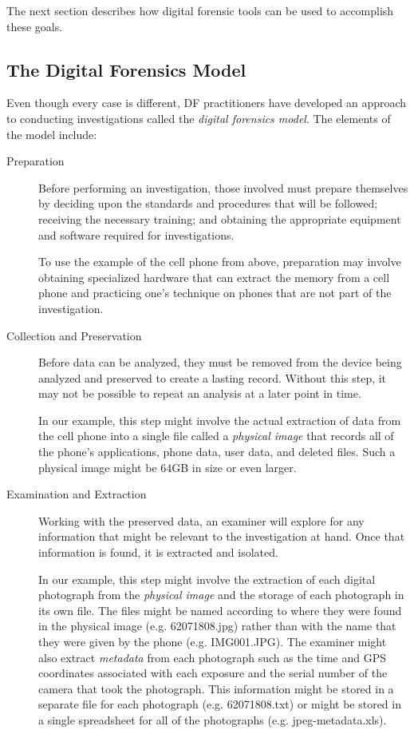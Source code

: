 The next section describes how digital forensic tools can be used to
accomplish these goals.

\subsection{The Digital Forensics Model}

Even though every case is different, DF practitioners have developed an
approach to conducting investigations called the 
\emph{digital forensics model}\cite{pollitt:models}. The 
elements of the model include:

\begin{description}
\item[Preparation] Before performing an investigation, those involved
  must prepare themselves by deciding upon the standards and
  procedures that will be followed; receiving the necessary training;
  and obtaining the appropriate equipment and software required for
  investigations. 

  To use the example of the cell phone from above,
  preparation may involve obtaining specialized hardware that can extract the
  memory from a cell phone and practicing one's technique on phones that are not part
  of the investigation.

\item[Collection and Preservation]
  Before data can be analyzed, they   must be removed from the
  device being analyzed and preserved to create a lasting
  record. Without this step, it may not be possible to repeat an
  analysis at a later point in time. 

  In our example, this step might involve the actual extraction of data
  from the cell phone into a single file called a \emph{physical
    image} that records all of the phone's applications, phone data, user data,
  and deleted files. Such a physical image might be 64GB in size or
  even larger.

\item[Examination and Extraction] Working with the preserved data, an
  examiner will explore for any information that might be
  relevant to the investigation at hand. Once that information is
  found, it is extracted and isolated.

  In our example, this step might involve the extraction of each
  digital photograph from the \emph{physical image} and the storage of
  each photograph in its own file. The files might be named according
  to where they were found in the physical image (e.g. 62071808.jpg)
  rather than with the name that they were given by the phone
  (e.g. IMG001.JPG). The examiner might also extract \emph{metadata}
  from each photograph such as the time and GPS coordinates associated
  with each exposure and the serial number of the camera that took the
  photograph. This information might be stored in a separate file for
  each photograph (e.g. 62071808.txt) or might be stored in a single
  spreadsheet for all of the photographs (e.g. jpeg-metadata.xls).


\end{description}
